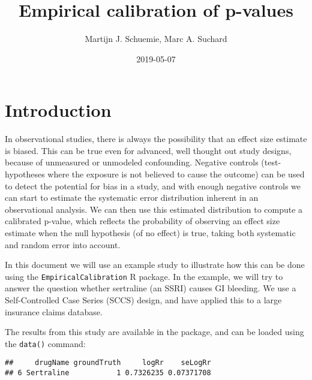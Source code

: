 \documentclass[]{article}
\title{Empirical calibration of p-values}
\author{Martijn J. Schuemie, Marc A. Suchard}
\date{2019-05-07}
\newenvironment{Shaded}{\begin{snugshade}}{\end{snugshade}}
\newcommand{\DecValTok}[1]{\textcolor[rgb]{0.00,0.00,0.81}{#1}}
\newcommand{\KeywordTok}[1]{\textcolor[rgb]{0.13,0.29,0.53}{\textbf{#1}}}
\newcommand{\NormalTok}[1]{#1}
\newcommand{\OperatorTok}[1]{\textcolor[rgb]{0.81,0.36,0.00}{\textbf{#1}}}
\newcommand{\StringTok}[1]{\textcolor[rgb]{0.31,0.60,0.02}{#1}}
\begin{document}
\maketitle

{
\setcounter{tocdepth}{2}
\tableofcontents
}
\hypertarget{introduction}{%
\section{Introduction}\label{introduction}}

In observational studies, there is always the possibility that an effect
size estimate is biased. This can be true even for advanced, well
thought out study designs, because of unmeasured or unmodeled
confounding. Negative controls (test-hypotheses where the exposure is
not believed to cause the outcome) can be used to detect the potential
for bias in a study, and with enough negative controls we can start to
estimate the systematic error distribution inherent in an observational
analysis. We can then use this estimated distribution to compute a
calibrated p-value, which reflects the probability of observing an
effect size estimate when the null hypothesis (of no effect) is true,
taking both systematic and random error into account.

In this document we will use an example study to illustrate how this can
be done using the \texttt{EmpiricalCalibration} R package. In the
example, we will try to answer the question whether sertraline (an SSRI)
causes GI bleeding. We use a Self-Controlled Case Series (SCCS) design,
and have applied this to a large insurance claims database.

The results from this study are available in the package, and can be
loaded using the \texttt{data()} command:

\begin{Shaded}
\end{Shaded}

\begin{verbatim}
##     drugName groundTruth     logRr    seLogRr
## 6 Sertraline           1 0.7326235 0.07371708
\end{verbatim}

\begin{Shaded}
\end{Shaded}
\end{document}
